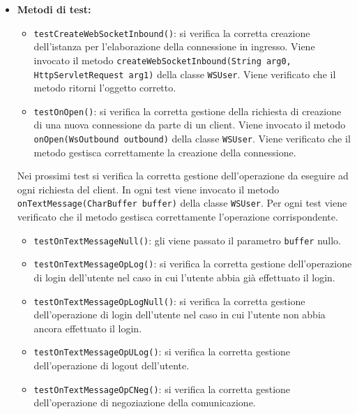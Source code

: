 {\begin{sloppypar}
{\begin{itemize}
\begin{itemize}
					\item[] \textbf{Metodi di test:}
					\begin{itemize}
						\item \texttt{testCreateWebSocketInbound()}: si verifica la corretta creazione dell'istanza per l'elaborazione della connessione in ingresso. Viene invocato il metodo \texttt{createWebSocketInbound(String arg0, HttpServletRequest arg1)} della classe \texttt{WSUser}. Viene verificato che il metodo ritorni l'oggetto corretto.
						
						\item \texttt{testOnOpen()}: si verifica la corretta gestione della richiesta di creazione di una nuova connessione da parte di un client. Viene invocato il metodo \texttt{onOpen(WsOutbound outbound)} della classe \texttt{WSUser}. Viene verificato che il metodo gestisca correttamente la creazione della connessione.
						\end{itemize}
						
Nei prossimi test si verifica la corretta gestione dell'operazione da eseguire ad ogni richiesta del client. In ogni test viene invocato il metodo \texttt{onTextMessage(CharBuffer buffer)} della classe \texttt{WSUser}. Per ogni test viene verificato che il metodo gestisca correttamente l'operazione corrispondente.
					\begin{itemize}
						\item \texttt{testOnTextMessageNull()}: gli viene passato il parametro \texttt{buffer} nullo.					
					
						\item \texttt{testOnTextMessageOpLog()}: si verifica la corretta gestione dell'operazione di login dell'utente nel caso in cui l'utente abbia già effettuato il login.
						
						\item \texttt{testOnTextMessageOpLogNull()}: si verifica la corretta gestione \newline dell'operazione di login dell'utente nel caso in cui l'utente non abbia ancora effettuato il login.
						
						\item \texttt{testOnTextMessageOpULog()}:  si verifica la corretta gestione dell'operazione di logout dell'utente.
						
						\item \texttt{testOnTextMessageOpCNeg()}: si verifica la corretta gestione dell'operazione di negoziazione della comunicazione.
						

\end{itemize}
\end{itemize}
\end{itemize}}
\end{sloppypar}}
